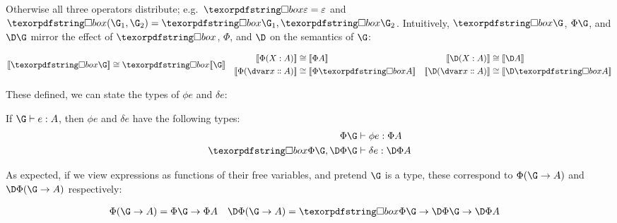 \noindent
Otherwise all three operators distribute; e.g.\ $\iso\emptycx = \emptycx$ and
$\iso(\G_1,\G_2) = \iso\G_1, \iso\G_2$.
%
Intuitively, $\iso\G$, $\Phi\G$, and $\D\G$ mirror the effect of
$\iso$, $\Phi$, and $\D$ on the semantics of $\G$:

\begin{align*}
  \den{\iso\G} &\cong \iso\den\G
  &
  \begin{aligned}
    \den{\Phi(\hm x A)} &\cong \den{\Phi A}
    \\
    \den{\Phi(\hd x A)} &\cong \den{\Phi \iso A}
  \end{aligned}
  &&
  \begin{aligned}
    \den{\D(\hm x A)} &\cong \den{\D A}
    \\
    \den{\D(\hd x A)} &\cong \den{\D \iso A}
  \end{aligned}
\end{align*}


\noindent
These defined, we can state the types of $\phi e$ and $\delta e$:

\begin{theorem}
  \label{theorem-type-correct}
  If\/ $\J e \G A$, then $\phi e$ and $\delta e$ have the following types:
  \begin{align*}
    \Jalign {\phi e} {\Phi\G} {\Phi A}\\
    \Jalign {\delta e} {\iso{\Phi\G}, \DP\G} {\DP A}
  \end{align*}
\end{theorem}


\noindent As expected, if we view expressions as functions of their free
variables, and pretend $\G$ is a type, these correspond to $\Phi(\G \to A)$
and $\DP(\G \to A)$ respectively:

\begin{align*}
  \Phi(\G \to A) &= \Phi\G \to \Phi A
  & \DP(\G \to A) &= \iso\Phi\G \to \DP\G \to \DP A
\end{align*}

